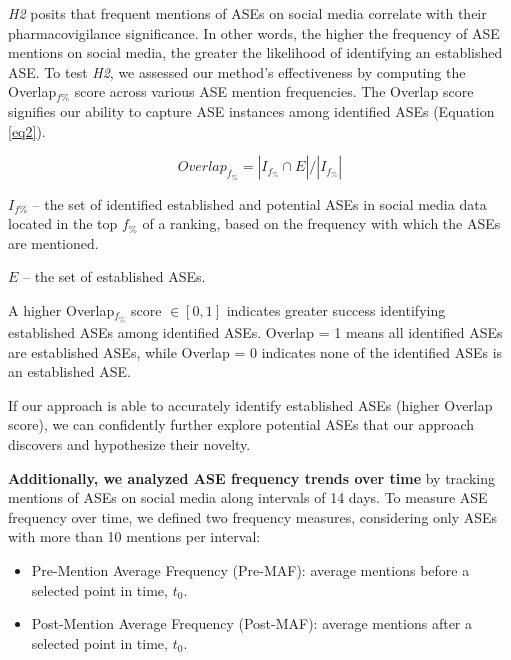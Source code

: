 \documentclass[referee,bst/sn-basic]{sn-jnl}%
\begin{document}
\textit{H2} posits that frequent mentions of ASEs on social media correlate with their  pharmacovigilance significance. 
In other words, the higher the frequency of ASE mentions on social media, the greater the likelihood of identifying an established ASE. 
To test \textit{H2}, we assessed our method’s effectiveness by computing the Overlap$_{f\%}$ score across various ASE mention frequencies.
The Overlap score signifies our ability to capture ASE instances among identified ASEs (Equation \ref{eq2}).

\begin{equation}
\label{eq2}
Overlap_{f_\%}=|I_{f_\%} \cap E |/|I_{f_\%}|
\end{equation}

$I_{f\%}$ -- the set of identified established and potential ASEs in social media data located in the top $f_\%$ of a ranking, based on the frequency with which the ASEs are mentioned.

$E$ -- the set of established ASEs.

A higher Overlap$_{f_\%}$ score $\in [0,1]$ indicates greater success identifying established ASEs among identified ASEs. 
Overlap = 1 means all identified ASEs are established ASEs, while Overlap = 0 indicates none of the identified ASEs is an established ASE.

If our approach is able to accurately identify established ASEs (higher Overlap score), we can confidently further explore potential ASEs that our approach discovers and hypothesize their novelty.

\textbf{Additionally, we analyzed ASE frequency trends over time}
by tracking mentions of ASEs on social media along intervals of 14 days.
To measure ASE frequency over time, we defined two frequency measures, considering only ASEs with more than 10 mentions per interval:

\begin{itemize}
\item
    Pre-Mention Average Frequency (Pre-MAF): average mentions before a selected point in time, $t_0$. 
\item 
    Post-Mention Average Frequency (Post-MAF): average mentions after a selected point in time, $t_0$.
\end{itemize}
\end{document}
